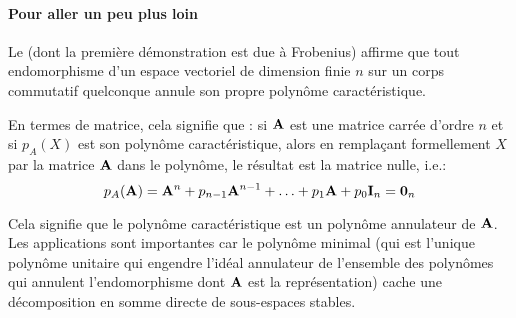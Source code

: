 \medskip
{}
\paragraph{Pour aller un peu plus loin}
Le 
(dont la première démonstration est due à Frobenius)
affirme que tout endomorphisme d'un espace vectoriel de dimension finie $n$ sur un corps commutatif quelconque
annule son propre polynôme caractéristique.

En termes de matrice, cela signifie que : si $\MM{A}$ est une matrice carrée d'ordre $n$ et si
$p_A(X)$ est son polynôme caractéristique, alors en remplaçant formellement
$X$ par la matrice $\MM{A}$ dans le polynôme, le résultat est la matrice nulle, i.e.:
\begin{equation}p_A(\MM{A})= \MM{A}^n + p_{n-1}\MM{A}^{n-1} + \ldots + p_1 \MM{A} + p_0 \MM{I}_n = \MM{0}_n \end{equation}

Cela signifie que le polynôme caractéristique est un
polynôme annulateur de $\MM{A}$.
Les applications sont importantes car le polynôme minimal (qui est l'unique polynôme unitaire qui
engendre l'idéal annulateur de l'ensemble des polynômes qui annulent l'endomorphisme dont $\MM{A}$
est la représentation) cache une décomposition en somme  directe de sous-espaces stables.











\medskip
